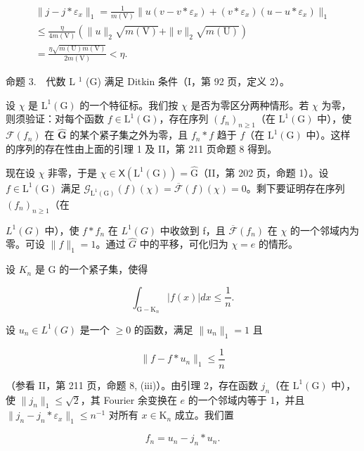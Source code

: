 \[
\begin{array}{l} \| j - j * \varepsilon_ {x} \| _ {1} = \frac {1}{m (\mathrm{V})} \| u (v - v * \varepsilon_ {x}) + (v * \varepsilon_ {x}) (u - u * \varepsilon_ {x}) \| _ {1} \\ \leqslant \frac {\eta}{4 m (\mathrm{V})} (\| u \| _ {2} \sqrt {m (\mathrm{V})} + \| v \| _ {2} \sqrt {m (\mathrm{U})}) \\ = \frac {\eta \sqrt {m (\mathrm{U}) m (\mathrm{V})}}{2 m (\mathrm{V})} <   \eta . \end{array}
\]

命题 3.　代数 L \(^{1}\) (G) 满足 Ditkin 条件（I，第 92 页，定义 2）。

设 \(\chi\) 是 \(\mathrm{L}^1 (\mathrm{G})\) 的一个特征标。我们按 \(\chi\) 是否为零区分两种情形。若 \(\chi\) 为零，则须验证：对每个函数 \(f\in \mathrm{L}^{1}(\mathrm{G})\)，存在序列 \((f_n)_{n\geqslant 1}\)（在 \(\mathrm{L}^1 (\mathrm{G})\) 中），使 \(\mathcal{F}(f_n)\) 在 \(\widehat{\mathbf{G}}\) 的某个紧子集之外为零，且 \(f_{n}*f\) 趋于 \(f\)（在 \(\mathrm{L}^1 (\mathrm{G})\) 中）。这样的序列的存在性由上面的引理 1 及 II，第 211 页命题 8 得到。

现在设 \(\chi\) 非零，于是 \(\chi \in \mathsf{X}(\mathrm{L}^1 (\mathrm{G})) = \widehat{\mathrm{G}}\)（II，第 202 页，命题 1）。设 \(f\in \mathrm{L}^{1}(\mathrm{G})\) 满足 \(\mathcal{G}_{\mathrm{L}^1 (\mathrm{G})}(f)(\chi) = \overline{\mathcal{F}} (f)(\chi) = 0\)。剩下要证明存在序列 \((f_n)_{n\geqslant 1}\)（在

\(L^{1}(G)\) 中），使 \(f * f_{n}\) 在 \(L^{1}(G)\) 中收敛到 f，且 \(\overline{\mathcal{F}}(f_{n})\) 在 \(\chi\) 的一个邻域内为零。可设 \(\|f\|_{1}=1\)。通过 \(\widehat{G}\) 中的平移，可化归为 \(\chi=e\) 的情形。

设 \(K_{n}\) 是 G 的一个紧子集，使得

\[
\int_ {\mathrm{G} - \mathrm{K} _ {n}} | f (x) | d x \leqslant \frac {1}{n}.
\]

设 \(u_{n} \in L^{1}(G)\) 是一个 \(\geqslant 0\) 的函数，满足 \(\|u_{n}\|_{1} = 1\) 且

\[
\| f - f * u _ {n} \| _ {1} \leqslant \frac {1}{n}
\]

（参看 II，第 211 页，命题 8, (iii)）。由引理 2，存在函数 \(j_n\)（在 \(\mathrm{L}^1(\mathrm{G})\) 中），使 \(\| j_n\| _1\leqslant \sqrt{2}\)，其 Fourier 余变换在 \(e\) 的一个邻域内等于 1，并且 \(\| j_{n} - j_{n}*\varepsilon_{x}\|_{1}\leqslant n^{-1}\) 对所有 \(x\in \mathrm{K}_n\) 成立。我们置

\[
f _ {n} = u _ {n} - j _ {n} * u _ {n}.
\]

